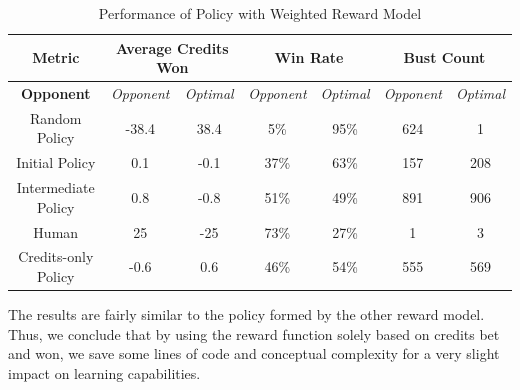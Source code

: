 \documentclass{article}
\begin{document}
\begin{table}[H]
\centering
\caption{Performance of Policy with Weighted Reward Model}
\begin{tabular}{ c | c | c | c | c | c | c }
 \textbf{Metric} & \multicolumn{2}{|c|}{\textbf{Average Credits Won}} & \multicolumn{2}{|c|}{\textbf{Win Rate}} & \multicolumn{2}{|c}{\textbf{Bust Count}} \\ \hline 
 \textbf{Opponent}  & \textit{Opponent} & \textit{Optimal} & \textit{Opponent} & \textit{Optimal} & \textit{Opponent} & \textit{Optimal} \\ \hline
 Random Policy & -38.4 & 38.4 & 5\% & 95\% & 624 & 1 \\
 Initial Policy & 0.1 & -0.1 & 37\% & 63\% & 157 & 208 \\
 Intermediate Policy & 0.8 & -0.8 & 51\% & 49\% & 891 & 906 \\
 Human & 25 & -25 & 73\% & 27\% & 1 & 3 \\ 
Credits-only Policy & -0.6 & 0.6 & 46\% & 54\% & 555 & 569 \\
\end{tabular}
\label{tab:results2}
\end{table}

The results are fairly similar to the policy formed by the other reward model. Thus, we conclude that by using the reward function solely based on credits bet and won, we save some lines of code and conceptual complexity for a very slight impact on learning capabilities.
\end{document}
